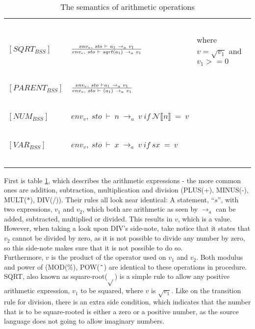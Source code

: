 \begin{table}[H]
\begin{tabular}{|l|l|l|}
			~			&															~																			& ~ \\
	$[SQRT_{BSS}]$		& $env_{v},~sto~\vdash~a_{1}~\rightarrow_{a}~v_{1} \over env_{v},~sto~\vdash~sqrt(a_{1})~\rightarrow_{a}~v_{1}$												& where $v = \sqrt{v_{1}}$ and $v_1 >= 0$ \\
			~			&															~																			& ~ \\
	$[PARENT_{BSS}]$	& $env_{v},~sto~\vdash a_{1}~\rightarrow_{a}~v_{1} \over env_{v},~sto~\vdash~(a_{1})~\rightarrow_{a}~v_{1}$													& ~ \\
			~			&															~																			& ~ \\
	$[NUM_{BSS}]$		& $env_{v},~sto~\vdash~n~\rightarrow_{a}~v~ if ~\mathcal{N}\llbracket n \rrbracket~=~v$															& ~ \\
			~			&															~																			& ~ \\
	$[VAR_{BSS}]$		& $env_{v},~sto~\vdash~x~\rightarrow_{a}~v~if~sx~=~v$														   									& ~ \\
			~			&															~																			& ~ \\
	\hline
	\end{tabular}
	\label{tab:semantics_aritmethic}
	\caption{The semantics of arithmetic operations}
\end{table}

First is table \ref{tab:semantics_aritmethic}, which describes the arithmetic expressions - the more common ones are addition, subtraction, multiplication and division (PLUS(+), MINUS(-), MULT(*), DIV(/)). Their rules all look near identical: A statement, ``$s$'', with two expressions, $v_{1}$ and $v_{2}$, which both are arithmetic as seen by $\rightarrow_{a}$ can be added, subtracted, multiplied or divided. This results in $v$, which is a value. However, when taking a look upon DIV's side-note, take notice that it states that $v_{2}$ cannot be divided by zero, as it is not possible to divide any number by zero, so this side-note makes sure that it is not possible to do so. \\
Furthermore, $v$ is the product of the operator used on $v_{1}$ and $v_{2}$. Both modulus and power of (MOD(\%), POW($\texttt{\^{}}$) are identical to these operations in procedure. \\
SQRT, also known as square-root($\sqrt{}$) is a simple rule to allow any positive arithmetic expression, $v_{1}$ to be squared, where $v$ is $\sqrt{v_{1}}$. Like on the transition rule for division, there is an extra side condition, which indicates that the number that is to be square-rooted is either a zero or a positive number, as the source language does not going to allow imaginary numbers. \\

